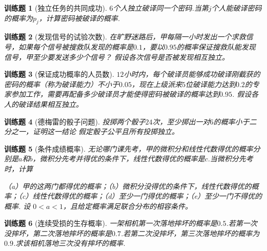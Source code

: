 \documentclass[UTF8,12pt,a4paper,fontset=fandol]{ctexbook}
\newtheorem{exercise}{训练题}[section]
\begin{document}
\begin{exercise}[独立任务的共同成功]\label{q:Y2.6}
$6$个人独立破译同一个密码.当第$j$个人能破译密码的概率为$p_j$，计算密码被破译的概率.\par{}\end{exercise}

\begin{exercise}[发现信号的试验次数]\label{q:Y2.7}
在旷野迷路后，甲每隔一小时发出一个求救信号，如果每个信号被搜救队发现的概率是$0.1$，要以$0.95$的概率保证搜救队能发现信号，甲至少要发送多少个信号？ 假设各次信号是否被发现相互独立。\par{}\end{exercise}

\begin{exercise}[保证成功概率的人员数]\label{q:Y2.9}
$12$小时内，每个破译员能够成功破译刚截获的密码的概率（称为破译能力）不小于$0.05$，现在上级派来$5$位破译能力达到$0.2$的专家参加工作，需要再配备多少破译员才能使得密码被破译的概率达到$0.95$. 假设各人的破译结果相互独立。\par{}\end{exercise}

\begin{exercise}[德梅雷的骰子问题]\label{q:Y2.10}
投掷两个骰子$24$次，至少掷出一对$6$的概率小于二分之一，证明这一结论 假定骰子公平且所有投掷独立。\par{}\end{exercise}

\begin{exercise}[条件成绩概率]\label{q:Y2.11}
无论哪门课先考，甲的微积分和线性代数得优的概率分别是$a$和$b$，微积分先考并得优的条件下，线性代数得优的概率是$c$.当微积分先考时，计算

（a）甲的这两门都得优的概率；（b）微积分没得优的条件下，线性代数得优的概率；（c）线性代数得优的概率；（d）至少一门得优的概率；（e）至少一门不得优的概率. 设 $0<a<1$，且给定概率满足联合分布的相容条件。\par{}\end{exercise}

\begin{exercise}[连续受损的生存概率]\label{q:Y2.12}
一架相机第一次落地摔坏的概率是$0.5$.若第一次没摔坏，第二次落地摔坏的概率是$0.7$.若第二次没摔坏，第三次落地摔坏的概率为$0.9$.求该相机落地三次没有摔坏的概率.\par{}\end{exercise}
\end{document}
